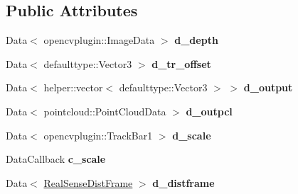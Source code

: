 \subsection*{Public Attributes}
\begin{DoxyCompactItemize}
\item 
\mbox{\label{classsofa_1_1rgbdtracking_1_1_real_sense_abstract_deprojector_ae7f5594d19b61c9fb590c52a691640e7}} 
Data$<$ opencvplugin\+::\+Image\+Data $>$ {\bfseries d\+\_\+depth}
\item 
\mbox{\label{classsofa_1_1rgbdtracking_1_1_real_sense_abstract_deprojector_a2f887b81e72511844e1dccc0bb8f9a2c}} 
Data$<$ defaulttype\+::\+Vector3 $>$ {\bfseries d\+\_\+tr\+\_\+offset}
\item 
\mbox{\label{classsofa_1_1rgbdtracking_1_1_real_sense_abstract_deprojector_a3ef009292c2c22613c774b73b327f366}} 
Data$<$ helper\+::vector$<$ defaulttype\+::\+Vector3 $>$ $>$ {\bfseries d\+\_\+output}
\item 
\mbox{\label{classsofa_1_1rgbdtracking_1_1_real_sense_abstract_deprojector_a93bfad0013b406e433cf07e342cdc4b5}} 
Data$<$ pointcloud\+::\+Point\+Cloud\+Data $>$ {\bfseries d\+\_\+outpcl}
\item 
\mbox{\label{classsofa_1_1rgbdtracking_1_1_real_sense_abstract_deprojector_a01e0cd824f7c1e046f9b8a4b0fb5b8ba}} 
Data$<$ opencvplugin\+::\+Track\+Bar1 $>$ {\bfseries d\+\_\+scale}
\item 
\mbox{\label{classsofa_1_1rgbdtracking_1_1_real_sense_abstract_deprojector_ac692621d9153db98d722796883b1cb88}} 
Data\+Callback {\bfseries c\+\_\+scale}
\item 
\mbox{\label{classsofa_1_1rgbdtracking_1_1_real_sense_abstract_deprojector_a06f9d1a842d19213587304d7e1889b8d}} 
Data$<$ \hyperlink{classsofa_1_1rgbdtracking_1_1_real_sense_dist_frame}{Real\+Sense\+Dist\+Frame} $>$ {\bfseries d\+\_\+distframe}

\end{DoxyCompactItemize}

